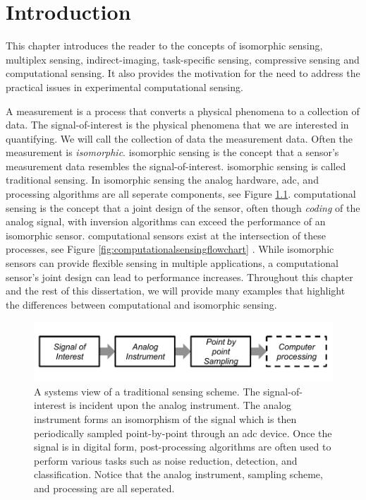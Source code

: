 \chapter{Introduction}

This chapter introduces the reader to the concepts of \gls{isomorphic sensing}, \gls{multiplex sensing}, \gls{indirect-imaging}, \gls{task-specific sensing}, \gls{compressive sensing} and \gls{computational sensing}. It also provides the motivation for the need to address the practical issues in experimental computational sensing. 

A \gls{measurement} is a process that converts a physical phenomena to a collection of data. The signal-of-interest is the physical phenomena that we are interested in quantifying. We will call the collection of data the measurement data. Often the measurement is \emph{\gls{isomorphic}}. \Gls{isomorphic sensing} is the concept that a sensor's measurement data resembles the signal-of-interest. \Gls{isomorphic sensing} is called \gls{traditional sensing}. In isomorphic sensing the analog hardware, \acrfull{adc}, and processing algorithms are all seperate components, see Figure \ref{fig:isomorphicsesingflowchart}. \Gls{computational sensing} is the concept that a joint design of the sensor, often though \emph{coding} of the analog signal, with inversion algorithms can exceed the performance of an isomorphic sensor. \Glspl{computational sensor} exist at the intersection of these processes, see Figure \ref{fig:computationalsensingflowchart} \cite{neifeld2006taskSpecificSensing}. While \gls{isomorphic} sensors can provide flexible sensing in multiple applications, a \gls{computational sensor}'s joint design can lead to performance increases. Throughout this chapter and the rest of this dissertation, we will provide many examples that highlight the differences between computational and isomorphic sensing. 

\begin{figure}
    \centering
    \includegraphics[scale=1]{isomorphicsensorflowchart}
    \caption{A systems view of a traditional sensing scheme. The signal-of-interest is incident upon the analog instrument. The analog instrument forms an isomorphism of the signal which is then periodically sampled point-by-point through an \gls{adc} device. Once the signal is in digital form, post-processing algorithms are often used to perform various tasks such as noise reduction, detection, and classification. Notice that the analog instrument, sampling scheme, and processing are all seperated. }
    \label{fig:isomorphicsesingflowchart}
\end{figure}


